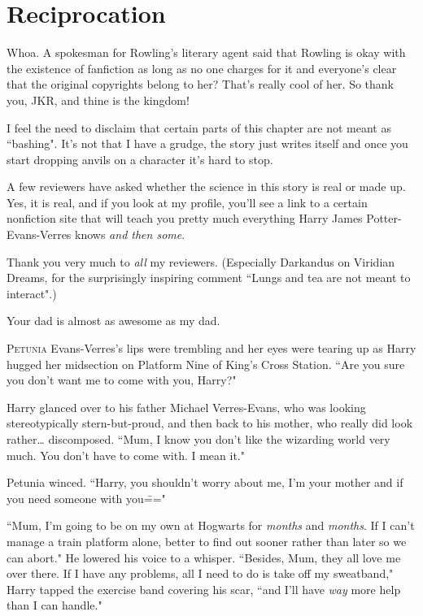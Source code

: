\chapter{Reciprocation}

\begin{chapterOpeningAuthorNote}
Whoa. A spokesman for Rowling's literary agent said that Rowling is okay with the existence of fanfiction as long as no one charges for it and everyone's clear that the original copyrights belong to her? That's really cool of her. So thank you, JKR, and thine is the kingdom!

I feel the need to disclaim that certain parts of this chapter are not meant as ``bashing". It's not that I have a grudge, the story just writes itself and once you start dropping anvils on a character it's hard to stop.

A few reviewers have asked whether the science in this story is real or made up. Yes, it is real, and if you look at my profile, you'll see a link to a certain nonfiction site that will teach you pretty much everything Harry James Potter-Evans-Verres knows \emph{and then some}.

Thank you very much to \emph{all} my reviewers. (Especially Darkandus on Viridian Dreams, for the surprisingly inspiring comment ``Lungs and tea are not meant to interact".)
\end{chapterOpeningAuthorNote}
\begin{chapterOpeningQuote}
Your dad is almost as awesome as my dad.
\end{chapterOpeningQuote}

\lettrine{P}{etunia} Evans-Verres's lips were trembling and her eyes were tearing up as Harry hugged her midsection on Platform Nine of King's Cross Station. ``Are you sure you don't want me to come with you, Harry?"

Harry glanced over to his father Michael Verres-Evans, who was looking stereotypically stern-but-proud, and then back to his mother, who really did look rather{\ldots} discomposed. ``Mum, I know you don't like the wizarding world very much. You don't have to come with. I mean it."

Petunia winced. ``Harry, you shouldn't worry about me, I'm your mother and if you need someone with you\==="

``Mum, I'm going to be on my own at Hogwarts for \emph{months} and \emph{months}. If I can't manage a train platform alone, better to find out sooner rather than later so we can abort." He lowered his voice to a whisper. ``Besides, Mum, they all love me over there. If I have any problems, all I need to do is take off my sweatband," Harry tapped the exercise band covering his scar, ``and I'll have \emph{way} more help than I can handle."

